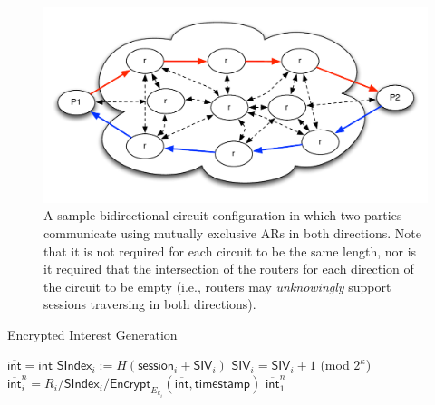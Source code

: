 \begin{figure}[ht!]
\begin{center}
\includegraphics[scale=0.5]{./images/pool.pdf}
\end{center}
\caption{A sample bidirectional circuit configuration in which two parties communicate using mutually exclusive ARs in both directions. Note that it is not required for each circuit to be the same length, nor is it required that the intersection of the routers for each direction of the circuit to be empty (i.e., routers may \emph{unknowingly} support sessions traversing in both directions).}
\label{fig:pool}
\end{figure}

\begin{algorithm}[ht!]
  \caption{Encrypted Interest Generation}
  \begin{algorithmic}[1]
\State $\overline{\mathsf{int}} = \mathsf{int}$
  \State $\mathsf{SIndex}_i := H(\mathsf{session}_i + \mathsf{SIV}_i)$
  \State $\mathsf{SIV}_i = \mathsf{SIV}_i + 1$ (mod $2^{\kappa}$)
  \State $\overline{\mathsf{int}}_i^n = R_i / \mathsf{SIndex}_i / \mathsf{Encrypt}_{E_{k_i}}(\overline{\mathsf{int}}, \mathsf{timestamp})$
\EndFor
\State \Return $\overline{\mathsf{int}}_1^n$
\end{algorithmic}
\label{alg:enc_int_gen}
\end{algorithm}

